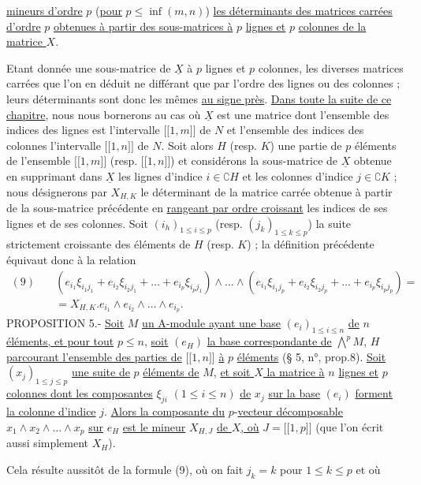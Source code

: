 \uline{mineurs d’ordre} $p$ (\uline{pour} $p\leq\inf(m,n)$) \uline{les déterminants des matrices carrées d’ordre} $p$ \uline{obtenues à partir des sous-matrices à} $p$ \uline{lignes et} $p$ \uline{colonnes de la matrice $X$}.

Etant donnée une sous-matrice de $\underline X$ à $p$ lignes et $p$ colonnes, les diverses matrices carrées que l’on en déduit ne différant que par l’ordre des lignes ou des colonnes ; leurs déterminants sont donc les mêmes \uline{au signe près}. \uline{Dans toute la suite de ce chapitre}, nous nous bornerons au cas où $\underline X$ est une matrice dont l’ensemble des indices des lignes est l’intervalle $\lbrack\!\lbrack1,m\rbrack\!\rbrack$ de $N$ et l’ensemble des indices des colonnes l’intervalle $\lbrack\!\lbrack1,n\rbrack\!\rbrack$ de $N$. Soit alors $H$ (resp. $K$) une partie de $p$ éléments de l’ensemble $\lbrack\!\lbrack1,m\rbrack\!\rbrack$ (resp. $\lbrack\!\lbrack1,n\rbrack\!\rbrack$) et considérons la sous-matrice de $\underline X$ obtenue en supprimant dans $\underline X$ les lignes d’indice $i\in\complement H$ et les colonnes d’indice $j\in\complement K$ ; nous désignerons par $X_{H,K}$ le déterminant de la matrice carrée obtenue à partir de la sous-matrice précédente en \uline{rangeant par ordre croissant} les indices de ses lignes et de ses colonnes. Soit $(i_h)_{1\leq i\leq p}$ (resp. $(j_k)_{1\leq k\leq p}$) la suite strictement croissante des éléments de $H$ (resp. $K$) ; la définition précédente équivaut donc à la relation
\[
\begin{split}
(9)\quad &(e_{i_1}\xi_{i_1j_1}+e_{i_2}\xi_{i_2j_1}+\ldots+e_{i_p}\xi_{i_pj_1})\wedge\ldots\wedge(e_{i_1}\xi_{i_1j_p}+e_{i_2}\xi_{i_2j_p}+\ldots+e_{i_p}\xi_{i_pj_p})=\\
&=X_{H,K}.e_{i_1}\wedge e_{i_2}\wedge\ldots\wedge e_{i_p}.
\end{split}
\]
PROPOSITION 5.- \uline{Soit} $M$ \uline{un A-module ayant une base} $(e_i)_{1\leq i\leq n}$ \uline{de} $n$ \uline{éléments, et pour tout} $p\leq n$, \uline{soit} $(e_H)$ \uline{la base correspondante de} $\bigwedge^pM$, $H$ \uline{parcourant l’ensemble des parties de} $\lbrack\!\lbrack1,n\rbrack\!\rbrack$ \uline{à} $p$ \uline{éléments} (§ 5, n°\quad, prop.8). \uline{Soit} $(x_j)_{1\leq j\leq p}$ \uline{une suite de} $p$ \uline{éléments de} $M$, \uline{et soit $X$ la matrice à} $n$ \uline{lignes et} $p$ \uline{colonnes dont les composantes} $\xi_{ji}$ $(1\leq i\leq n)$ \uline{de} $x_j$ \uline{sur la base} $(e_i)$ \uline{forment la colonne d’indice} $j$. \uline{Alors la composante du} $p$-\uline{vecteur décomposable} $x_1\wedge x_2\wedge\ldots\wedge x_p$ \uline{sur} $e_H$ \uline{est le mineur} $X_{H,J}$ \uline{de $X$, où} $J=\lbrack\!\lbrack1,p\rbrack\!\rbrack$ (que l’on écrit aussi simplement $X_H$).

Cela résulte aussitôt de la formule (9), où on fait $j_k=k$ pour $1\leq k\leq p$ et où
